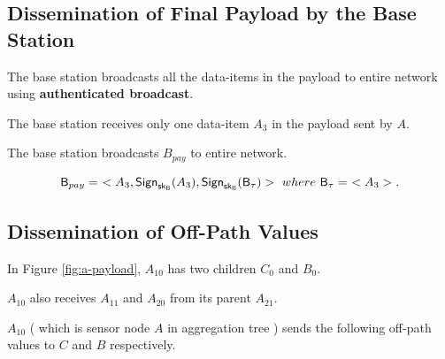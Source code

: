 \documentclass[%
  slidesonly,%
  semlayer%
  ]{seminar}                                  %
\newcommand{\sk}{\sf{sk}}
\begin{document}
\begin{slide}
      \vfill
      \clearpage

    \subsection*{Dissemination of Final Payload by the Base Station}

      The base station broadcasts all the data-items in the payload to entire network using \textbf{authenticated broadcast}.
        
      The base station receives only one data-item $A_{3}$ in the payload sent by $A$.
      
      The base station broadcasts $B_{pay}$ to entire network.

      \begin{equation*}
        \textsf{B}_{pay} =\ <A_{3}, \textsf{Sign}_{\sk_{\textsf{B}}}(A_{3}), \textsf{Sign}_{\sk_{\textsf{B}}}(\textsf{B}_{\tau})>\ where\ \textsf{B}_{\tau} =\ <A_{3}>.
      \end{equation*}
      \vfill
      \clearpage

    \subsection*{Dissemination of Off-Path Values}
        
        In Figure \ref{fig:a-payload}, $A_{10}$ has two children $C_{0}$ and $B_{0}$.
        
        $A_{10}$ also receives $A_{11}$ and $A_{20}$ from its parent $A_{21}$.
        
        $A_{10}$ ( which is sensor node $A$ in aggregation tree ) sends the following off-path values to $C$ and $B$ respectively.
        
        
        

\end{slide}
\end{document}
